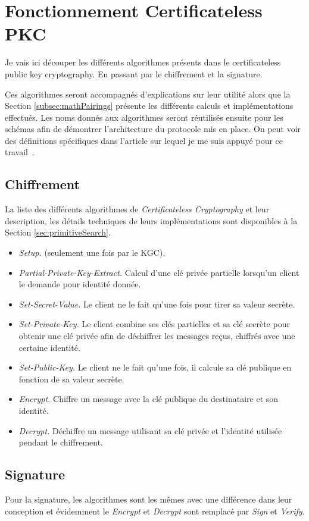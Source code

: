 \section{Fonctionnement Certificateless PKC}
Je vais ici découper les différents algorithmes présents dans le certificateless public key cryptography. En passant par le chiffrement et la signature.

Ces algorithmes seront accompagnés d'explications sur leur utilité alors que la Section \ref{subsec:mathPairings} présente les différents calculs et implémentations effectués. Les noms donnés aux algorithmes seront réutilisés ensuite pour les schémas afin de démontrer l'architecture du protocole mis en place. On peut voir des définitions spécifiques dans l'article sur lequel je me suis appuyé pour ce travail~\cite{conf/pkc/DentLP08}.
\subsection{Chiffrement}
La liste des différents algorithmes de \textit{Certificateless Cryptography} et leur description, les détails techniques de leurs implémentations sont disponibles à la Section \ref{sec:primitiveSearch}.
\begin{itemize}
	\item \textit{Setup.} (seulement une fois par le KGC).
	\item \textit{Partial-Private-Key-Extract.} Calcul d'une clé privée partielle lorsqu'un client le demande pour identité donnée.
	\item \textit{Set-Secret-Value.} Le client ne le fait qu'une fois pour tirer sa valeur secrète.
	\item \textit{Set-Private-Key.} Le client combine ses clés partielles et sa clé secrète pour obtenir une clé privée afin de déchiffrer les messages reçus, chiffrés avec une certaine identité.
	\item \textit{Set-Public-Key.} Le client ne le fait qu'une fois, il calcule sa clé publique en fonction de sa valeur secrète.
	\item \textit{Encrypt.} Chiffre un message avec la clé publique du destinataire et son identité.
	\item \textit{Decrypt.} Déchiffre un message utilisant sa clé privée et l'identité utilisée pendant le chiffrement.
\end{itemize}
\subsection{Signature}
Pour la signature, les algorithmes sont les mêmes avec une différence dans leur conception et évidemment le \textit{Encrypt} et \textit{Decrypt} sont remplacé par \textit{Sign} et \textit{Verify}.

